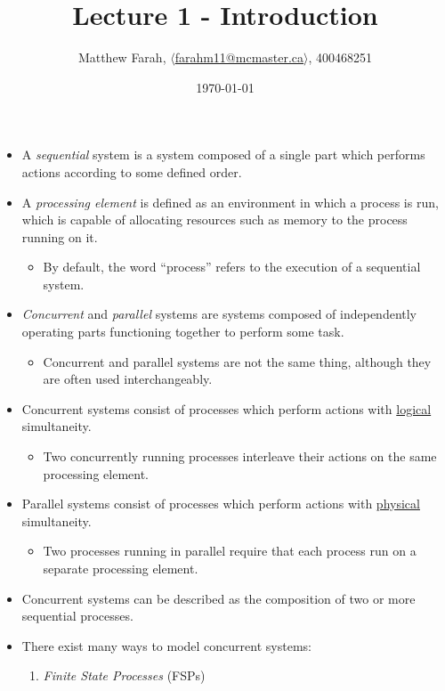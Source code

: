 \documentclass{article}
\title{Lecture 1 - Introduction}
\author{Matthew Farah, \href{mailto:farahm11@mcmaster.ca}{$\langle$farahm11@mcmaster.ca$\rangle$}, 400468251}
\date{\today}
\begin{document}
\maketitle
\pagestyle{fancy}

\fi

\begin{itemize}
	\item A \emph{sequential} system is a system composed of a single part which performs actions according to some defined order.
	\item A \emph{processing element} is defined as an environment in which a process is run, which is capable of allocating resources such as memory to the process running on it.
	\begin{itemize}
		\item By default, the word ``process'' refers to the execution of a sequential system.
	\end{itemize}
	\item \emph{Concurrent} and \emph{parallel} systems are systems composed of independently operating parts functioning together to perform some task.
	\begin{itemize}
		\item Concurrent and parallel systems are not the same thing, although they are often used interchangeably.
	\end{itemize}
	\item Concurrent systems consist of processes which perform actions with \underline{logical} simultaneity.
	\begin{itemize}
		\item Two concurrently running processes interleave their actions on the same processing element.
	\end{itemize}
	\item Parallel systems consist of processes which perform actions with \underline{physical} simultaneity.
	\begin{itemize}
		\item Two processes running in parallel require that each process run on a separate processing element.
	\end{itemize}
	\item Concurrent systems can be described as the composition of two or more sequential processes.
	\item There exist many ways to model concurrent systems:
	\begin{enumerate}
		\item \emph{Finite State Processes} (FSPs)
		\begin{itemize}

\end{itemize}
\end{enumerate}
\end{itemize}
\end{document}
